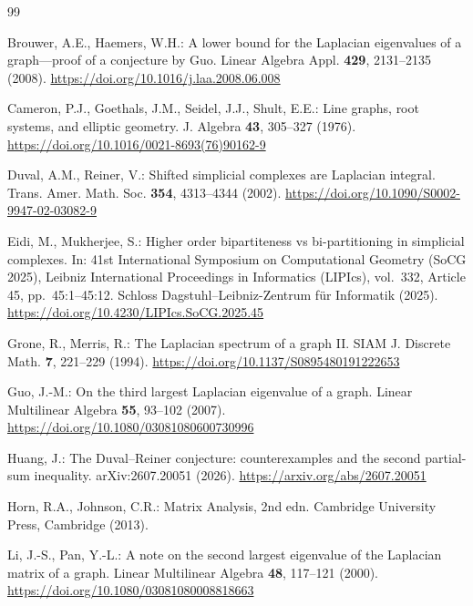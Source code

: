 \documentclass[11pt,reqno]{amsart}
\numberwithin{equation}{section}
\theoremstyle{plain}
\theoremstyle{definition}
\begin{document}
\begin{thebibliography}{99}

Brouwer, A.E., Haemers, W.H.: A lower bound for the Laplacian eigenvalues of a graph---proof
of a conjecture by Guo. Linear Algebra Appl. \textbf{429}, 2131--2135 (2008).
\href{https://doi.org/10.1016/j.laa.2008.06.008}{https://doi.org/10.1016/j.laa.2008.06.008}

Cameron, P.J., Goethals, J.M., Seidel, J.J., Shult, E.E.: Line graphs, root systems, and
elliptic geometry. J. Algebra \textbf{43}, 305--327 (1976).
\href{https://doi.org/10.1016/0021-8693(76)90162-9}{https://doi.org/10.1016/0021-8693(76)90162-9}

Duval, A.M., Reiner, V.: Shifted simplicial complexes are Laplacian integral.
Trans. Amer. Math. Soc. \textbf{354}, 4313--4344 (2002).
\href{https://doi.org/10.1090/S0002-9947-02-03082-9}{https://doi.org/10.1090/S0002-9947-02-03082-9}

Eidi, M., Mukherjee, S.: Higher order bipartiteness vs bi-partitioning in simplicial complexes.
In: 41st International Symposium on Computational Geometry (SoCG 2025), Leibniz International
Proceedings in Informatics (LIPIcs), vol.~332, Article 45, pp.~45:1--45:12. Schloss
Dagstuhl--Leibniz-Zentrum f\"ur Informatik (2025).
\href{https://doi.org/10.4230/LIPIcs.SoCG.2025.45}{https://doi.org/10.4230/LIPIcs.SoCG.2025.45}

Grone, R., Merris, R.: The Laplacian spectrum of a graph II\@.
SIAM J. Discrete Math. \textbf{7}, 221--229 (1994).
\href{https://doi.org/10.1137/S0895480191222653}{https://doi.org/10.1137/S0895480191222653}

Guo, J.-M.: On the third largest Laplacian eigenvalue of a graph.
Linear Multilinear Algebra \textbf{55}, 93--102 (2007).
\href{https://doi.org/10.1080/03081080600730996}{https://doi.org/10.1080/03081080600730996}

Huang, J.: The Duval--Reiner conjecture: counterexamples and the second partial-sum inequality.
arXiv:2607.20051 (2026).
\href{https://arxiv.org/abs/2607.20051}{https://arxiv.org/abs/2607.20051}



Horn, R.A., Johnson, C.R.: Matrix Analysis, 2nd edn. Cambridge University Press,
Cambridge (2013).

Li, J.-S., Pan, Y.-L.: A note on the second largest eigenvalue of the Laplacian matrix of a
graph. Linear Multilinear Algebra \textbf{48}, 117--121 (2000).
\href{https://doi.org/10.1080/03081080008818663}{https://doi.org/10.1080/03081080008818663}


\end{thebibliography}
\end{document}
